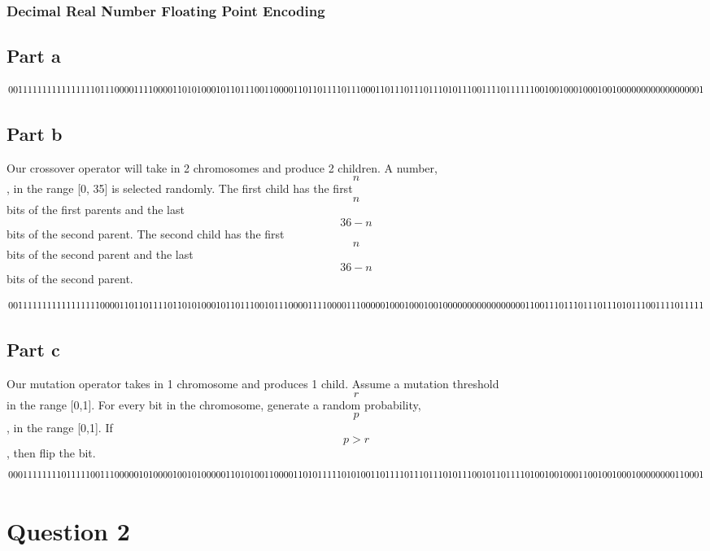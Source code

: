 \documentclass[a4paper]{article}
\begin{document}
\subsubsection{Decimal Real Number Floating Point Encoding}
\subsection{Part a}
\[
0011 11111111111111 0111 00001111000011 \\
0101 00010110111001 1000 01101101111011 \\
1000 11011101110111 0101 11001111011111 \\
1001 00100010001001 0000 00000000000001 \\
\]
\subsection{Part b}
Our crossover operator will take in 2 chromosomes and produce 2 children. A number, $$n$$,  in the range [0, 35] is selected randomly. The first child has the first $$n$$ bits of the first parents and the last $$36-n$$ bits of the second parent. The second child has the first $$n$$ bits of the second parent and the last $$36-n$$ bits of the second parent.

\[
0011 11111111111111 1000 01101101111011 \\
0101 00010110111001 0111 00001111000011 \\
1000 00100010001001 0000 00000000000001 \\
1001 11011101110111 0101 11001111011111 \\
\]
\subsection{Part c}
Our mutation operator takes in 1 chromosome and produces 1 child. Assume a mutation threshold $$r$$ in the range [0,1]. For every bit in the chromosome, generate a random probability, $$p$$, in the range [0,1]. If $$p > r$$, then flip the bit.
\[
0001 11111110111110 0111 00000101000010 \\
0101 00000110101001 1000 01101011111010 \\
1001 10111101110111 0101 11001011011110 \\
1001 00100011001001 0001 00000000110001 \\
\]

\section{Question 2}
\end{document}
